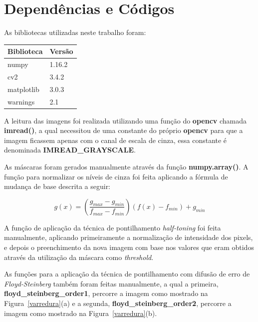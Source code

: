 \documentclass[twoside,twocolumn]{article}
\begin{document}
\section{Dependências e Códigos}

As bibliotecas utilizadas neste trabalho foram:

\begin{table}[H]
\begin{tabular}{|l|l|}
\hline
\textbf{Biblioteca} & \textbf{Versão} \\ \hline
numpy               & 1.16.2          \\ \hline
cv2                 & 3.4.2           \\ \hline
matplotlib          & 3.0.3           \\ \hline
warnings            & 2.1             \\ \hline
\end{tabular}
\end{table}

A leitura das imagens foi realizada utilizando uma função do \textbf{opencv} \cite{b1} chamada \textbf{imread()}, a qual necessitou de uma constante do próprio \textbf{opencv} para que a imagem ficassem apenas com o canal de escala de cinza, essa constante é denominada \textbf{IMREAD\_GRAYSCALE}.

As máscaras foram gerados manualmente através da função \textbf{numpy.array()}. A função para normalizar os níveis de cinza foi feita aplicando a fórmula de mudança de base descrita a seguir:

\begin{equation*}
	g(x) = \left(\dfrac{g_{max} - g_{min}}{f_{max} - f_{min}}\right) (f(x) - f_{min}) + g_{min}
\end{equation*}

A função de aplicação da técnica de pontilhamento \textit{half-toning} foi feita manualmente, aplicando primeiramente a normalização de intensidade dos pixels, e depois o preenchimento da nova imagem com base nos valores que eram obtidos através da utilização da máscara como \textit{threshold}.

As funções para a aplicação da técnica de pontilhamento com difusão de erro de \textit{Floyd-Steinberg} também foram feitas manualmente, a qual a primeira, \textbf{floyd\_steinberg\_order1}, percorre a imagem como mostrado na Figura~\ref{varredura}(a) e a segunda, \textbf{floyd\_steinberg\_order2}, percorre a imagem como mostrado na Figura~\ref{varredura}(b).

\end{document}
